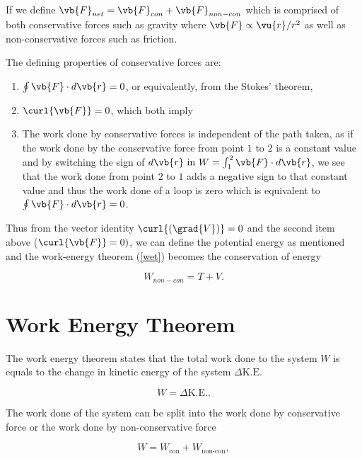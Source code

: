 \documentclass[a4paper,12pt]{report}
\begin{document}
If we define \(\vb{F} _{net} = \vb{F} _{con} + \vb{F} _{non-con} \) which is comprised of both conservative forces such as gravity where \(\vb{F} \propto \vu{r} /r^2\) as well as non-conservative forces such as friction.

The defining properties of conservative forces are:

\begin{enumerate}
	\item \(\oint \vb{F} \cdot d\vb{r} = 0\), or equivalently, from the Stokes' theorem,

	\item \(\curl{\vb{F} } = 0\), which both imply

	\item The work done by conservative forces is independent of the path taken, as if the work done by the conservative force from point \(1\) to \(2\) is a constant value and by switching the sign of \(d\vb{r} \text{ in } W = \int_{1}^{2} \vb{F} \cdot d\vb{r}  \), we see that the work done from point \(2\) to \(1\) adds a negative sign to that constant value and thus the work done of a loop is zero which is equivalent to \(\oint \vb{F} \cdot d\vb{r} =0\).
\end{enumerate}

Thus from the vector identity \(\curl{(\grad{V}) } = 0\) and the second item above (\(\curl{\vb{F} } =0)\), we can define the potential energy as mentioned and the work-energy theorem (\cref{wet}) becomes the conservation of energy

\begin{equation}
	W_{non-con} = T + V. \label{con} 
\end{equation}

\section{Work Energy Theorem}

The work energy theorem states that the total work done to the system \(W\) is equals to the change in kinetic energy of the system \(\Delta \text{K.E.}\) 

\begin{equation}
	W = \Delta \text{K.E.} .
\end{equation}

The work done of the system can be split into the work done by conservative force or the work done by non-conservative force

\begin{equation}
	W = W_{\text{con} } + W_{\text{non-con} },  
\end{equation}
\end{document}
